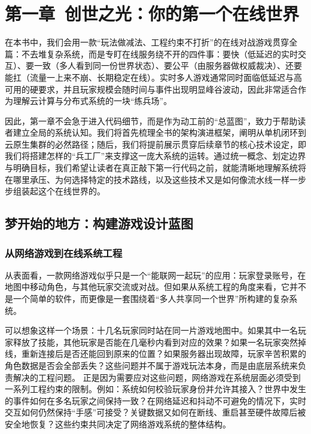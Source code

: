 \section{第一章\ 创世之光：你的第一个在线世界}
在本书中，我们会用一款“玩法做减法、工程约束不打折”的在线对战游戏贯穿全篇：不去堆复杂系统，而是专盯在线服务绕不开的四件事：要快（低延迟的实时交互）、要一致（多人看到同一份世界状态）、要公平（由服务器做权威裁决）、还要能扛（流量一上来不崩、长期稳定在线）。实时多人游戏通常同时面临低延迟与高可用的硬要求，并且玩家规模会随时间与事件出现明显峰谷波动，因此非常适合作为理解云计算与分布式系统的一块“练兵场”。

因此，第一章不会急于进入代码细节，而是作为动工前的“总蓝图”，致力于帮助读者建立全局的系统认知。我们将首先梳理全书的架构演进框架，阐明从单机闭环到云原生集群的必然路径；随后，我们将提前展示贯穿后续章节的核心技术设定，即我们将搭建怎样的“兵工厂”来支撑这一庞大系统的运转。通过统一概念、划定边界与明确目标，我们希望让读者在真正敲下第一行代码之前，就能清晰地理解系统将在哪里承压、为何选择特定的技术路线，以及这些技术又是如何像流水线一样一步步组装起这个在线世界的。



\subsection{梦开始的地方：构建游戏设计蓝图}


\subsubsection{从网络游戏到在线系统工程}\label{subsubsec:从网络游戏到云计算项目} %

从表面看，一款网络游戏似乎只是一个“能联网一起玩”的应用：玩家登录账号，在地图中移动角色，与其他玩家交流或对战。但如果从系统工程的角度来看，它并不是一个简单的软件，而更像是一套围绕着“多人共享同一个世界”所构建的复杂系统。

可以想象这样一个场景：十几名玩家同时站在同一片游戏地图中。如果其中一名玩家释放了技能，其他玩家是否能在几毫秒内看到对应的效果？如果一名玩家突然掉线，重新连接后是否还能回到原来的位置？如果服务器出现故障，玩家辛苦积累的角色数据是否会全部丢失？这些问题并不属于游戏玩法本身，而是由底层系统来负责解决的工程问题。
正是因为需要应对这些问题，网络游戏在系统层面必须受到一系列工程约束的限制。例如：系统如何校验玩家身份并允许其接入？世界中发生的事件如何在多名玩家之间保持一致？在网络延迟和抖动不可避免的情况下，实时交互如何仍然保持“手感”可接受？关键数据又如何在断线、重启甚至硬件故障后被安全地恢复？这些约束共同决定了网络游戏系统的整体结构。

